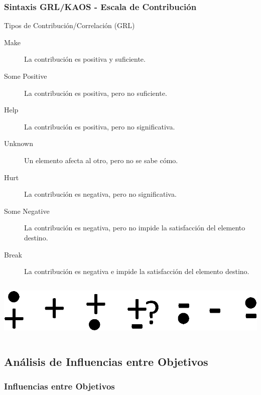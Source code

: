 \documentclass[slidestop,xcolor=pst,dvips,blue]{beamer}
\begin{document}
\begin{frame}[c]
    \frametitle{Sintaxis GRL/KAOS - Escala de Contribución}
    \begin{block}{Tipos de Contribución/Correlación (GRL)}
        \begin{description}
            \item[Make] La contribución es positiva y suficiente.
            \item[Some Positive] La contribución es positiva, pero no suficiente.
            \item[Help] La contribución es positiva, pero no significativa.
            \item[Unknown] Un elemento afecta al otro, pero no se sabe cómo.
            \item[Hurt] La contribución es negativa, pero no significativa.
            \item[Some Negative] La contribución es negativa, pero no impide la satisfacción del elemento destino.
            \item[Break] La contribución es negativa e impide la satisfacción del elemento destino.
        \end{description}
        \begin{columns}[c]
            \begin{column}{\linewidth}
                \centering \includegraphics[width=0.70\columnwidth,keepaspectratio=true]{images/objetivos/influence(GRL).eps}
            \end{column}
        \end{columns}
    \end{block}
\end{frame}

\subsection{Análisis de Influencias entre Objetivos}

\begin{frame}[t]
	\frametitle{Influencias entre Objetivos}
\end{frame}
\end{document}
